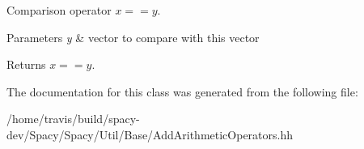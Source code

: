 \-Comparison operator $ x==y$. 


\begin{DoxyParams}{\-Parameters}
{\em y} & vector to compare with this vector \\
\hline
\end{DoxyParams}
\begin{DoxyReturn}{\-Returns}
$ x==y$. 
\end{DoxyReturn}


\-The documentation for this class was generated from the following file\-:\begin{DoxyCompactItemize}
\item 
/home/travis/build/spacy-\/dev/\-Spacy/\-Spacy/\-Util/\-Base/\-Add\-Arithmetic\-Operators.\-hh\end{DoxyCompactItemize}
